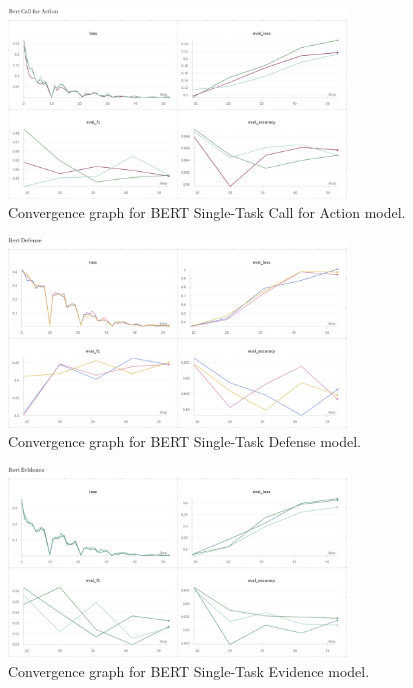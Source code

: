 \documentclass{article}
\begin{document}
\begin{figure}[H]
    \centering
    \includegraphics[width=0.8\textwidth]{convergence_graphs/bert_call_for_action.png}
    \caption{Convergence graph for BERT Single-Task Call for Action model.}
    \label{fig:bert_call_for_action}
\end{figure}

\begin{figure}[H]
    \centering
    \includegraphics[width=0.8\textwidth]{convergence_graphs/bert_defense.png}
    \caption{Convergence graph for BERT Single-Task Defense model.}
    \label{fig:bert_defense}
\end{figure}

\begin{figure}[H]
    \centering
    \includegraphics[width=0.8\textwidth]{convergence_graphs/bert_evidence.png}
    \caption{Convergence graph for BERT Single-Task Evidence model.}
    \label{fig:bert_evidence}
\end{figure}
\end{document}
